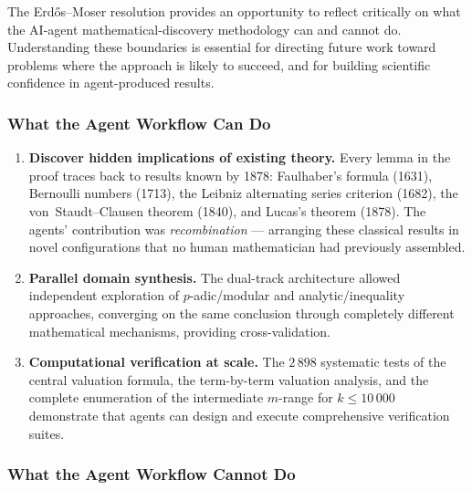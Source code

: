 \documentclass[12pt,a4paper]{article}
\theoremstyle{plain}
\theoremstyle{definition}
\begin{document}
The Erd\H{o}s--Moser resolution provides an opportunity to reflect
critically on what the AI-agent mathematical-discovery methodology
can and cannot do.  Understanding these boundaries is essential for
directing future work toward problems where the approach is likely to
succeed, and for building scientific confidence in agent-produced
results.

\subsubsection{What the Agent Workflow Can Do}

\begin{enumerate}[label=(\arabic*), nosep]
  \item \textbf{Discover hidden implications of existing theory.}
    Every lemma in the proof traces back to results known by 1878:
    Faulhaber's formula (1631), Bernoulli numbers (1713), the Leibniz
    alternating series criterion (1682), the von~Staudt--Clausen theorem
    (1840), and Lucas's theorem (1878).  The agents' contribution was
    \emph{recombination} --- arranging these classical results in novel
    configurations that no human mathematician had previously assembled.

  \item \textbf{Parallel domain synthesis.}
    The dual-track architecture allowed independent exploration of
    $p$-adic/modular and analytic/inequality approaches, converging on
    the same conclusion through completely different mathematical
    mechanisms, providing cross-validation.

  \item \textbf{Computational verification at scale.}
    The $2\,898$ systematic tests of the central valuation formula,
    the term-by-term valuation analysis, and the complete enumeration
    of the intermediate $m$-range for $k \le 10\,000$ demonstrate
    that agents can design and execute comprehensive verification
    suites.
\end{enumerate}

\subsubsection{What the Agent Workflow Cannot Do}
\end{document}
